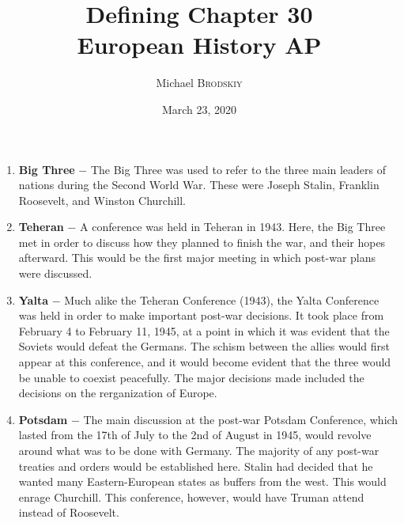 \documentclass[12pt]{article}
\newcommand{\subtitle}[1]{%
  \posttitle{%
    \par\end{center}
    \begin{center}\large#1\end{center}
    \vskip0.5em}%
}
\begin{document}

\author{Michael \textsc{Brodskiy}}
\title{Defining Chapter 30 \\European History AP}
\subtitle{Mrs Fisher}
\date{March 23, 2020}
\maketitle


\begin{flushleft}
\begin{enumerate}

	\item \textbf{Big Three} $-$ The Big Three was used to refer to the three main leaders of nations during the Second World War. These were Joseph Stalin, Franklin Roosevelt, and Winston Churchill.

	\item \textbf{Teheran} $-$ A conference was held in Teheran in 1943. Here, the Big Three met in order to discuss how they planned to finish the war, and their hopes afterward. This would be the first major meeting in which post-war plans were discussed.

	\item \textbf{Yalta} $-$ Much alike the Teheran Conference (1943), the Yalta Conference was held in order to make important post-war decisions. It took place from February 4 to February 11, 1945, at a point in which it was evident that the Soviets would defeat the Germans. The schism between the allies would first appear at this conference, and it would become evident that the three would be unable to coexist peacefully. The major decisions made included the decisions on the rerganization of Europe.

	\item \textbf{Potsdam} $-$ The main discussion at the post-war Potsdam Conference, which lasted from the 17th of July to the 2nd of August in 1945, would revolve around what was to be done with Germany. The majority of any post-war treaties and orders would be established here. Stalin had decided that he wanted many Eastern-European states as buffers from the west. This would enrage Churchill. This conference, however, would have Truman attend instead of Roosevelt.


\end{enumerate}
\end{flushleft}
\end{document}
